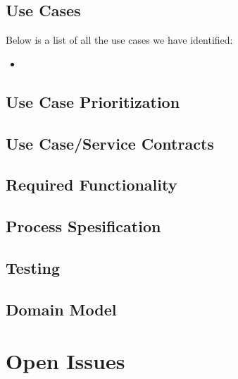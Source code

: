 \documentclass[12pt]{article}
\begin{document}
\subsection{Use Cases }
Below is a list of all the use cases we have identified:

\begin{itemize}

\item 

\end{itemize}


\subsection{Use Case Prioritization}

\subsection{Use Case/Service Contracts}

\subsection{Required Functionality}

\subsection{Process Spesification}

\subsection{Testing}

\subsection{Domain Model}


\section{Open Issues}
\end{document}
